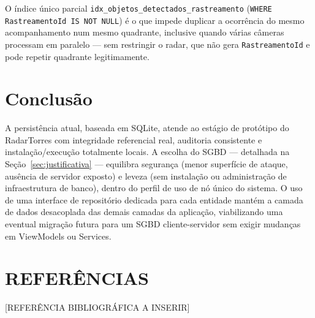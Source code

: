 O índice único parcial \texttt{idx\_objetos\_detectados\_rastreamento} (\texttt{WHERE
RastreamentoId IS NOT NULL}) é o que impede duplicar a ocorrência do mesmo acompanhamento num
mesmo quadrante, inclusive quando várias câmeras processam em paralelo — sem restringir o radar,
que não gera \texttt{RastreamentoId} e pode repetir quadrante legitimamente.

\section{Conclusão}

A persistência atual, baseada em SQLite, atende ao estágio de protótipo do RadarTorres com
integridade referencial real, auditoria consistente e instalação/execução totalmente locais. A
escolha do SGBD — detalhada na Seção~\ref{sec:justificativa} — equilibra segurança (menor
superfície de ataque, ausência de servidor exposto) e leveza (sem instalação ou administração de
infraestrutura de banco), dentro do perfil de uso de nó único do sistema. O uso de uma interface
de repositório dedicada para cada entidade mantém a camada de dados desacoplada das demais
camadas da aplicação, viabilizando uma eventual migração futura para um SGBD cliente-servidor
sem exigir mudanças em ViewModels ou Services.

\section*{REFERÊNCIAS}
\small
\raggedright
[REFERÊNCIA BIBLIOGRÁFICA A INSERIR]
